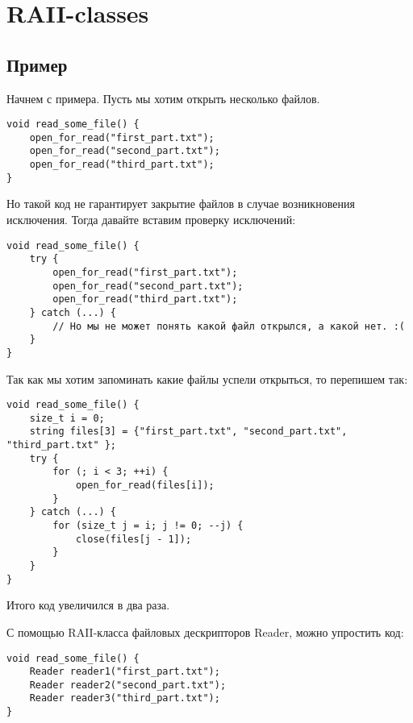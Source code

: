 \section{RAII-classes}
\subsection{Пример}
Начнем с примера. Пусть мы хотим открыть несколько файлов.

\begin{verbatim}
void read_some_file() {
    open_for_read("first_part.txt");
    open_for_read("second_part.txt");
    open_for_read("third_part.txt");
}
\end{verbatim}


Но такой код не гарантирует закрытие файлов в случае возникновения исключения.
Тогда давайте вставим проверку исключений:
\begin{verbatim}
void read_some_file() {
    try {
        open_for_read("first_part.txt");
        open_for_read("second_part.txt");
        open_for_read("third_part.txt");
    } catch (...) {
        // Но мы не может понять какой файл открылся, а какой нет. :(
    }
}
\end{verbatim}

Так как мы хотим запоминать какие файлы успели открыться, то перепишем так:

\begin{verbatim}
void read_some_file() {
    size_t i = 0;
    string files[3] = {"first_part.txt", "second_part.txt", "third_part.txt" };
    try {
        for (; i < 3; ++i) {
            open_for_read(files[i]);
        }
    } catch (...) {
        for (size_t j = i; j != 0; --j) {
            close(files[j - 1]);
        }
    }
}
\end{verbatim}

Итого код увеличился в два раза.

С помощью RAII-класса файловых дескрипторов Reader, можно упростить код:

\begin{verbatim}
void read_some_file() {
    Reader reader1("first_part.txt");
    Reader reader2("second_part.txt");
    Reader reader3("third_part.txt");
}
\end{verbatim}

